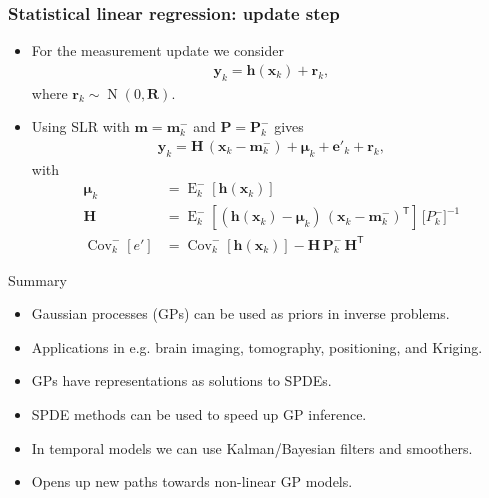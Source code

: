 \documentclass[first=dgreen,second=purple,presentation]{elecslides}
\newcommand{\mbf}[1]{\mathbf{#1}}
\newcommand{\mathbold}[1]{\bm{#1}}
\newcommand{\T}[0]{\mathsf{T}}
\DeclareMathOperator{\Cov}{Cov}
\DeclareMathOperator{\E}{E}
\DeclareMathOperator{\N}{N}
\newcommand{\vmu}[0]{\mathbold{\mu}}
\newcommand{\ve}{\mbf{e}}
\newcommand{\vh}{\mbf{h}}
\newcommand{\vm}{\mbf{m}}
\newcommand{\vr}{\mbf{r}}
\newcommand{\vx}{\mbf{x}}
\newcommand{\vy}{\mbf{y}}
\newcommand{\MH}{\mbf{H}}
\newcommand{\MP}{\mbf{P}}
\newcommand{\MR}{\mbf{R}}
\begin{document}
\begin{frame}
 \frametitle{Statistical linear regression: update step}

\begin{itemize}[<+->]
\item For the \alert{measurement update} we consider
%
\begin{equation}
\begin{split}
  \vy_k = \vh(\vx_k) + \vr_k,
\end{split}
\nonumber
\end{equation}
%
where $\vr_k \sim \N(0,\MR)$.

\item \alert{Using SLR} with $\vm = \vm_k^-$ and $\MP = \MP_k^-$ gives
%
\begin{equation}
\begin{split}
  \vy_{k} = \MH \, (\vx_{k} - \vm_{k}^-) + \vmu_k + \ve'_{k} + \vr_{k},
\end{split}
\nonumber
\end{equation}
%
with
%
\begin{equation}
\begin{split}
 \vmu_k &= \E_k^-[ \vh(\vx_{k})] \\
  \MH    &= \E_k^-\left[ (\vh(\vx_{k}) - \vmu_k) \, (\vx_{k} - \vm_{k}^-)^\T \right] \, \Big[ P_{k}^- \Big]^{-1} \\
  \Cov_k^-[e'] &= \Cov_k^-[ \vh(\vx_{k}) ] - \MH \, \MP_{k}^- \, \MH^\T
\end{split}
\nonumber
\end{equation}
%
\end{itemize}
\end{frame}



\begin{frame}{Summary}
\begin{itemize}[<+->]
\item Gaussian processes (GPs) can be used as \alert{priors in inverse problems}.
\item Applications in e.g. \alert{brain imaging, tomography, positioning, and Kriging}.
\item GPs have representations as \alert{solutions to SPDEs}.
\item SPDE methods can be used to \alert{speed up GP inference}.
\item In temporal models we can use \alert{Kalman/Bayesian filters and smoothers}.
\item Opens up new paths towards \alert{non-linear GP models}.
\end{itemize}
\end{frame}


\end{document}
